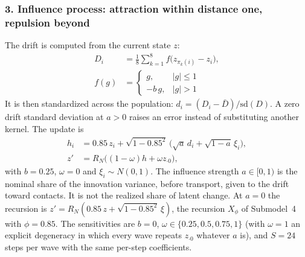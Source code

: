 \subsubsection*{3. Influence process: attraction within distance one, repulsion beyond}
The drift is computed from the current state $z$:
\begin{align*}
D_i&=\frac18\sum_{k=1}^8 f\bigl(z_{\pi_k(i)}-z_i\bigr),\\
f(g)&=\begin{cases}g,&|g|\le1\\-b\,g,&|g|>1\end{cases}
\end{align*}
It is then standardized across the population: $d_i=(D_i-\bar D)/\mathrm{sd}(D)$. A zero drift standard deviation at $a>0$ raises an error instead of substituting another kernel. The update is
\begin{align*}
h_i&=0.85\,z_i+\sqrt{1-0.85^2}\,\bigl(\sqrt a\,d_i+\sqrt{1-a}\,\xi_i\bigr),\\
z'&=R_N\bigl((1-\omega)h+\omega z_{\cdot0}\bigr),
\end{align*}
with $b=0.25$, $\omega=0$ and $\xi_i\sim N(0,1)$. The influence strength $a\in[0,1)$ is the nominal share of the innovation variance, before transport, given to the drift toward contacts. It is not the realized share of latent change. At $a=0$ the recursion is $z'=R_N(0.85\,z+\sqrt{1-0.85^2}\,\xi)$, the recursion $X_\phi$ of Submodel~4 with $\phi=0.85$. The sensitivities are $b=0$, $\omega\in\{0.25,0.5,0.75,1\}$ (with $\omega=1$ an explicit degeneracy in which every wave repeats $z_{\cdot0}$ whatever $a$ is), and $S=24$ steps per wave with the same per-step coefficients.

